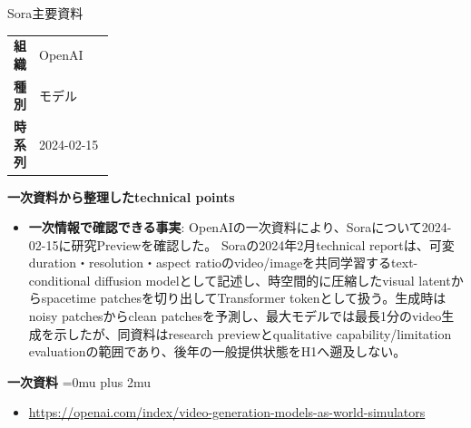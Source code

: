 \Needspace{0.38\textheight}
\begin{technicalnote}{Sora}{主要資料}
\begingroup
\begin{tabularx}{\linewidth}{@{}>{\bfseries}p{0.22\linewidth}X@{}}
組織 & OpenAI \\
種別 & モデル \\
時系列 & 2024-02-15 \\
\end{tabularx}
\smallskip
\begin{minipage}{\linewidth}
{\bfseries 一次資料から整理したtechnical points}
\begin{itemize}[leftmargin=1.5em,itemsep=0.35em]
\item \textbf{一次情報で確認できる事実}: OpenAIの一次資料により、Soraについて2024-02-15に研究Previewを確認した。 Soraの2024年2月technical reportは、可変duration・resolution・aspect ratioのvideo/imageを共同学習するtext-conditional diffusion modelとして記述し、時空間的に圧縮したvisual latentからspacetime patchesを切り出してTransformer tokenとして扱う。生成時はnoisy patchesからclean patchesを予測し、最大モデルでは最長1分のvideo生成を示したが、同資料はresearch previewとqualitative capability/limitation evaluationの範囲であり、後年の一般提供状態をH1へ遡及しない。
\end{itemize}
\begin{minipage}{\linewidth}
\begin{samepage}
{\bfseries 一次資料}
\begingroup\sloppy
\Urlmuskip=0mu plus 2mu\relax
\begin{itemize}[leftmargin=1.5em,itemsep=0.25em]
\item {\scriptsize\url{https://openai.com/index/video-generation-models-as-world-simulators}}
\end{itemize}
\endgroup
\end{samepage}
\end{minipage}
\end{minipage}
\endgroup
\end{technicalnote}
\medskip

